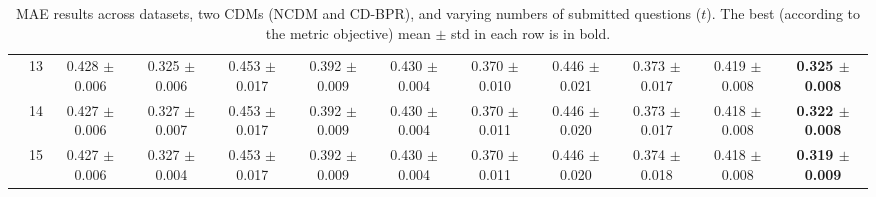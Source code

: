 \begin{table*}[t]
{\begin{tabular}{%
  ll
  @{\quad}
  c@{\hskip 4pt}c
  @{\quad\quad}
  c@{\hskip 4pt}c
  @{\quad\quad}
  c@{\hskip 4pt}c
  @{\quad\quad}
  c@{\hskip 4pt}c
  @{\quad\quad}
  c@{\hskip 4pt}c
}
        & 13 & 0.428 $\pm$ 0.006 & 0.325 $\pm$ 0.006 & 0.453 $\pm$ 0.017 & 0.392 $\pm$ 0.009 & 0.430 $\pm$ 0.004 & 0.370 $\pm$ 0.010 & 0.446 $\pm$ 0.021 & 0.373 $\pm$ 0.017 & 0.419 $\pm$ 0.008 & \textbf{0.325 $\pm$ 0.008} \\
        & 14 & 0.427 $\pm$ 0.006 & 0.327 $\pm$ 0.007 & 0.453 $\pm$ 0.017 & 0.392 $\pm$ 0.009 & 0.430 $\pm$ 0.004 & 0.370 $\pm$ 0.011 & 0.446 $\pm$ 0.020 & 0.373 $\pm$ 0.017 & 0.418 $\pm$ 0.008 & \textbf{0.322 $\pm$ 0.008} \\
        & 15 & 0.427 $\pm$ 0.006 & 0.327 $\pm$ 0.004 & 0.453 $\pm$ 0.017 & 0.392 $\pm$ 0.009 & 0.430 $\pm$ 0.004 & 0.370 $\pm$ 0.011 & 0.446 $\pm$ 0.020 & 0.374 $\pm$ 0.018 & 0.418 $\pm$ 0.008 & \textbf{0.319 $\pm$ 0.009} \\
\bottomrule
\end{tabular}
}
\caption{MAE results across datasets, two CDMs (NCDM and CD-BPR), and varying numbers of submitted questions ($t$). The best (according to the metric objective) mean $\pm$ std in each row is in bold.}
\label{tab:results-mae}
\end{table*}



